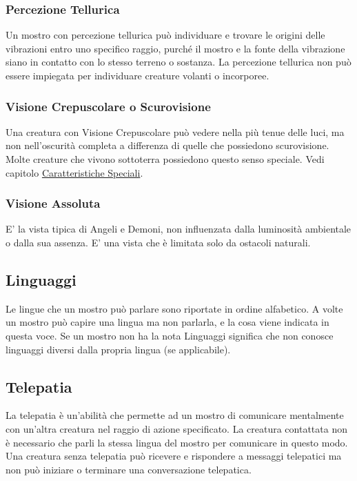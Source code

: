 \documentclass[12pt,a4paper,twoside,openany]{book}
\begin{document}
\begin{multicols}{2}
\subsubsection{Percezione Tellurica}

Un mostro con percezione tellurica può individuare e trovare le origini delle vibrazioni entro uno specifico raggio, purché il mostro e la fonte della vibrazione siano in contatto con lo stesso terreno o sostanza. La percezione tellurica non può essere impiegata per individuare creature volanti o incorporee.

\subsubsection{Visione Crepuscolare o Scurovisione}

Una creatura con Visione Crepuscolare può vedere nella più tenue delle luci, ma non nell'oscurità completa a differenza di quelle che possiedono scurovisione. Molte creature che vivono sottoterra possiedono questo senso speciale.  Vedi capitolo \hyperlink{visioneeluce}{Caratteristiche Speciali}.


\subsubsection{Visione Assoluta}

E' la vista tipica di Angeli e Demoni, non influenzata dalla luminosità ambientale o dalla sua assenza. E' una vista che è limitata solo da ostacoli naturali.

\subsection{Linguaggi}

Le lingue che un mostro può parlare sono riportate in ordine alfabetico. A volte un mostro può capire una lingua ma non parlarla, e la cosa viene indicata in questa voce. Se un mostro non ha la nota Linguaggi significa che non conosce linguaggi diversi dalla propria lingua (se applicabile).

\subsection{Telepatia}

La telepatia è un'abilità che permette ad un mostro di comunicare mentalmente con un'altra creatura nel raggio di azione specificato. La creatura contattata non è necessario che parli la stessa lingua del mostro per comunicare in questo modo. Una creatura senza telepatia può ricevere e rispondere a messaggi telepatici ma non può iniziare o terminare una conversazione telepatica.


\end{multicols}
\end{document}
